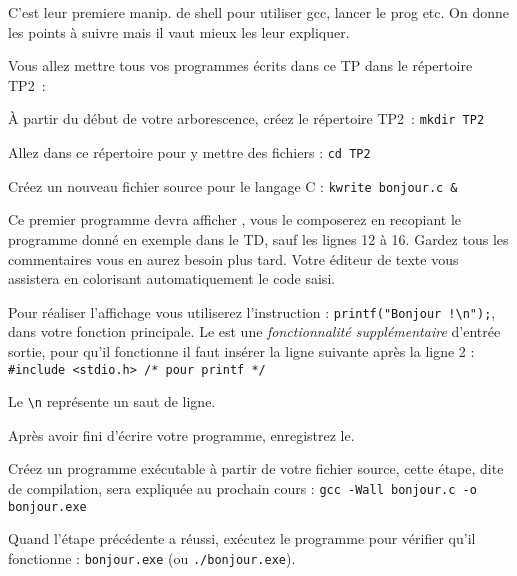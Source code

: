
\renewcommand{\labelitemi}{$\bullet$}

\newcommand{\commentaire}[1]{}


\vspace{-1em}
\begin{correction}
  C'est leur premiere manip. de shell pour utiliser gcc, lancer le
  prog etc. On donne les points à suivre mais il vaut mieux les leur
  expliquer.
\end{correction}

Vous allez mettre tous vos programmes écrits dans ce TP dans le
répertoire TP2~: 

\begin{newenu}
\item À partir du début de votre arborescence, créez le répertoire
  TP2~: \verb|mkdir TP2|  
\item Allez dans ce répertoire pour y mettre des fichiers : 
  \verb|cd TP2| 
\item Créez un nouveau fichier source pour le langage C : 
  \verb|kwrite bonjour.c &|
\end{newenu}


Ce premier programme devra afficher , vous le composerez en recopiant le programme donné en exemple dans le TD, sauf les lignes 12 à 16. Gardez tous les commentaires vous en aurez besoin plus tard. Votre éditeur de texte vous assistera en colorisant automatiquement le code saisi. 

Pour réaliser l'affichage vous utiliserez l'instruction : \verb+printf("Bonjour !\n");+, dans votre fonction principale. Le  est une \emph{fonctionnalité supplémentaire} d'entrée sortie, pour qu'il fonctionne il faut  insérer la ligne suivante après la ligne 2 : 
\verb+#include <stdio.h> /* pour printf */+

Le \verb+\n+ représente un saut de ligne. 

\begin{lastenu}
\item Après avoir fini d'écrire votre programme, enregistrez le.
\item Créez un programme exécutable à partir de votre fichier source, cette étape, dite de compilation, sera expliquée au prochain cours :
  \verb|gcc -Wall bonjour.c -o bonjour.exe|
\item Quand l'étape précédente a réussi, exécutez le programme pour
  vérifier qu'il fonctionne : \verb|bonjour.exe| (ou
  \verb|./bonjour.exe|).
\end{lastenu}

